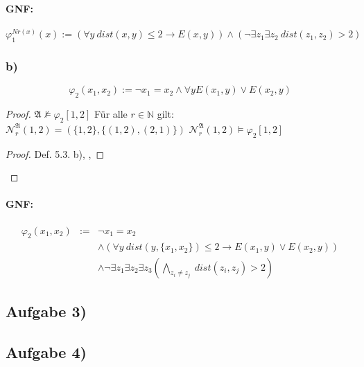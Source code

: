 \documentclass[12pt]{article}
\begin{document}
\paragraph{GNF:}
\[ \varphi_1^{Nr(x)}(x) := ( \forall y\ dist(x,y) \leq 2 \rightarrow E(x,y) ) 
  \land ( \neg \exists z_1 \exists z_2\ dist(z_1,z_2) > 2 )  
\] 


\subsubsection*{b)}

\[ \varphi_2(x_1,x_2) := \neg x_1=x_2 \land \forall y E(x_1,y) \lor E(x_2,y) \] 

\begin{proof}
   {}
   {}
   {}
   {$\mathfrak{A} \nvDash \varphi_2[1,2]$}
   { Für alle $r\in \mathbb{N}$ gilt: $\mathcal{N}_r^\mathfrak{A} (1,2) = 
    (\{1,2\},\{(1,2),(2,1)\})$ }
   {$\mathcal{N}_r^\mathfrak{A}(1,2) \models \varphi_2[1,2]$}
  \qedstep 
  \begin{proof}
    \pf Def. 5.3. b), , 
  \end{proof}
\end{proof}

\paragraph{GNF:}

\begin{eqnarray}
  \varphi_2(x_1,x_2) &:= &\neg x_1=x_2 \\ 
  && \land ( \forall y\ dist(y, \{x_1, x_2\})\leq 2 \rightarrow E(x_1,y) \lor E(x_2,y) ) \\ 
  && \land \neg \exists z_1 \exists z_2 \exists z_3 ( \bigwedge_{z_i\neq z_j}\ dist(z_i,z_j) > 2 )
\end{eqnarray}


\subsection*{Aufgabe 3)}

\subsection*{Aufgabe 4)}
\end{document}
